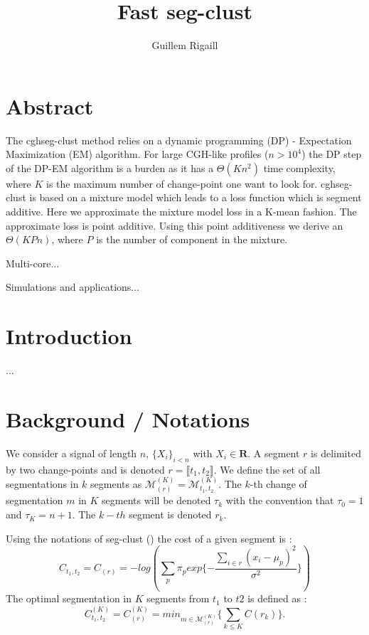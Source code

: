 \documentclass[a4paper,12pt,twoside]{report}
\title{Fast seg-clust}
\author{Guillem Rigaill}
\begin{document}
\maketitle

\tableofcontents

\section{Abstract}
The cghseg-clust method relies on a dynamic programming (DP) - Expectation Maximization (EM) algorithm.
For large CGH-like profiles ($n > 10^4$) the DP step of the DP-EM algorithm is a burden as it has a $\Theta(Kn^2)$ time complexity, where $K$ is the maximum number of change-point one want to look for. 
cghseg-clust is based on a mixture model which leads to a loss function which is segment additive.
Here we approximate the mixture model loss in a K-mean fashion. The approximate loss is point additive.
Using this point additiveness we derive an  $\Theta(KPn)$, where $P$ is the number of component in the mixture.

Multi-core...

Simulations and applications...


\section{Introduction}
...


\section{Background / Notations}
We consider a signal of length $n$, $\{X_i\}_{i < n}$ with $X_i \in \mathbf{R}$.
A segment $r$ is delimited by two change-points and is denoted
 $r = \llbracket t_1, t_2 \rrbracket$.
We define the set of all segmentations in $k$ segments as $\mathcal{M}^{(K)}_{(r)} = \mathcal{M}^{(K)}_{t_1, t_2}$.
The $k$-th change of segmentation $m$ in $K$ segments will be denoted $\tau_k$ with the convention that $\tau_0 = 1$ and $\tau_K = n+1$.
The $k-th$ segment is denoted $r_k$.


Using the notations of seg-clust (\cite{picard_2007}) the cost of a given segment is :
$$ C_{t_1, t_2} =C_{(r)} = -log\left(\sum_p \pi_p exp\{ - \frac{\sum_{i \in r} (x_i - \mu_p)^2 }{ \sigma^2} \}\right)$$ 
The optimal segmentation in $K$ segments from $t_1$ to $t2$ is defined as :
$$C_{t_1, t_2}^{(K)} = C^{(K)}_{(r)} = min_{m \in \mathcal{M}^{(K)}_{(r)}} \{ \sum_{k \leq K} C(r_k) \}.$$
\end{document}
